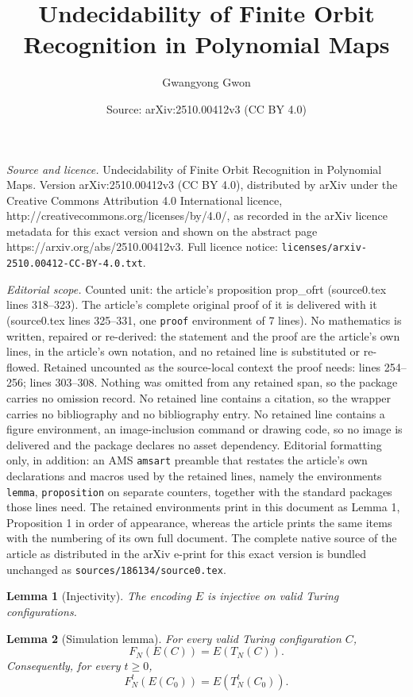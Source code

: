 \documentclass[10pt,a4paper]{amsart}
\title{Undecidability of Finite Orbit Recognition in Polynomial Maps}
\author{Gwangyong Gwon}
\date{Source: arXiv:2510.00412v3 (CC BY 4.0)}
\newtheorem{lemma}{Lemma}
\begin{document}
\maketitle

\noindent\emph{Source and licence.} Undecidability of Finite Orbit Recognition in Polynomial Maps. Version arXiv:2510.00412v3 (CC BY 4.0), distributed by arXiv under the Creative Commons Attribution 4.0 International licence, http://creativecommons.org/licenses/by/4.0/, as recorded in the arXiv licence metadata for this exact version and shown on the abstract page https://arxiv.org/abs/2510.00412v3. Full licence notice: \texttt{licenses/arxiv-2510.00412-CC-BY-4.0.txt}.\par\smallskip

\noindent\textit{Editorial scope.} Counted unit: the article's proposition prop\_ofrt (source0.tex lines 318--323). The article's complete original proof of it is delivered with it (source0.tex lines 325--331, one \texttt{proof} environment of 7 lines). No mathematics is written, repaired or re-derived: the statement and the proof are the article's own lines, in the article's own notation, and no retained line is substituted or re-flowed.  Retained uncounted as the source-local context the proof needs: lines 254--256; lines 303--308.  Nothing was omitted from any retained span, so the package carries no omission record.  No retained line contains a citation, so the wrapper carries no bibliography and no bibliography entry.  No retained line contains a figure environment, an image-inclusion command or drawing code, so no image is delivered and the package declares no asset dependency.  Editorial formatting only, in addition: an AMS \texttt{amsart} preamble that restates the article's own declarations and macros used by the retained lines, namely the environments \texttt{lemma}, \texttt{proposition} on separate counters, together with the standard packages those lines need.  The retained environments print in this document as Lemma 1, Proposition 1 in order of appearance, whereas the article prints the same items with the numbering of its own full document.  The complete native source of the article as distributed in the arXiv e-print for this exact version is bundled unchanged as \texttt{sources/186134/source0.tex}.
\begin{lemma}[Injectivity]\label{lem_inj}
The encoding $E$ is injective on valid Turing configurations.
\end{lemma}

\begin{lemma}[Simulation lemma]\label{lem_sim}
For every valid Turing configuration $C$,
\[F_N(E(C))=E(T_N(C)).\]
Consequently, for every $t\ge0$,
\[F^t_N(E(C_0))=E(T^t_N(C_0)).\]
\end{lemma}
\end{document}
